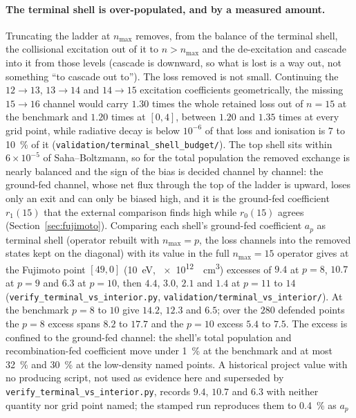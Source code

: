 \paragraph{The terminal shell is over-populated, and by a measured amount.}
Truncating the ladder at $n_{\max}$ removes, from the balance of the terminal
shell, the collisional excitation out of it to $n > n_{\max}$ and the
de-excitation and cascade into it from those levels (cascade is downward, so
what is lost is a way out, not something ``to cascade out to''). The loss removed is not small. Continuing the $12\to13$, $13\to14$
and $14\to15$ excitation coefficients geometrically, the missing $15\to16$
channel would carry $1.30$ times the whole retained loss out of $n=15$ at the
benchmark and $1.20$ times at $[0,4]$, between $1.20$ and $1.35$ times at
every grid point, while radiative decay is below $10^{-6}$ of that loss and
ionisation is $7$ to \SI{10}{\percent} of it
(\texttt{validation/terminal\_shell\_budget/}). The top shell sits within
$6\times10^{-5}$ of Saha--Boltzmann, so for the total population the removed
exchange is nearly balanced and the sign of the bias is decided channel by
channel: the ground-fed channel, whose net flux through the top of the ladder
is upward, loses only an exit and can only be biased high, and it is the
ground-fed coefficient $r_1(15)$ that the external comparison finds high while
$r_0(15)$ agrees (Section~\ref{sec:fujimoto}). Comparing each shell's ground-fed coefficient $a_p$ as terminal
shell (operator rebuilt with $n_{\max}=p$, the loss channels into the removed states kept on the diagonal) with its
value in the full $n_{\max}=15$ operator gives at the Fujimoto point $[49,0]$ (\SI{10}{\electronvolt},
\SI{e12}{\per\cubic\centi\metre}) excesses of $9.4$ at $p=8$, $10.7$ at $p=9$ and $6.3$ at $p=10$, then $4.4$,
$3.0$, $2.1$ and $1.4$ at $p=11$ to $14$ (\texttt{verify\_terminal\_vs\_interior.py},
\texttt{validation/terminal\_vs\_interior/}). At the benchmark $p=8$ to $10$ give $14.2$, $12.3$ and $6.5$; over
the $280$ defended points the $p=8$ excess spans $8.2$ to $17.7$ and the $p=10$ excess $5.4$ to $7.5$. The excess
is confined to the ground-fed channel: the shell's total population and recombination-fed coefficient move under
\SI{1}{\percent} at the benchmark and at most \SI{32}{\percent} and \SI{30}{\percent} at the low-density named
points. A historical project value with no producing script, not used as evidence here and superseded by
\texttt{verify\_terminal\_vs\_interior.py}, records $9.4$, $10.7$ and
$6.3$ with neither quantity nor grid point named; the stamped run reproduces them to \SI{0.4}{\percent} as $a_p$
